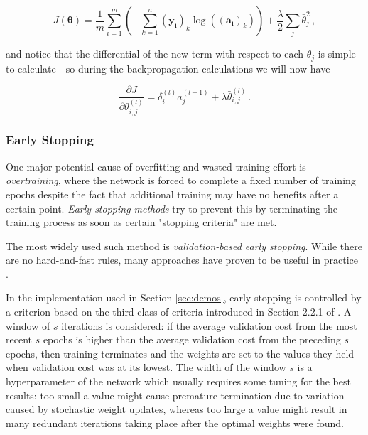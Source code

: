 \documentclass{article}[11pt]
\begin{document}
            $$
            J(\boldsymbol{\theta}) = \frac{1}{m} \sum_{i=1}^{m} \left( - \sum_{k=1}^{n} (\mathbf{y_i})_k \log(\mathbf{(a_i)}_k) \right) + \frac{\lambda}{2} \sum_j \bar{\theta}_j^2 \,,
            $$
            
            and notice that the differential of the new term with respect to each $\theta_j$ is simple to calculate - so during the backpropagation calculations we will now have
            
            $$
            \frac{\partial J}{\partial \theta^{(l)}_{i,j}} = \delta^{(l)}_i a^{(l-1)}_j + \lambda \bar{\theta}^{(l)}_{i,j} \,.
            $$
            
        
        
        \subsubsection{Early Stopping} \label{sec:early_stopping}
            
            One major potential cause of overfitting and wasted training effort is \textit{overtraining}, where the network is forced to complete a fixed number of training epochs despite the fact that additional training may have no benefits after a certain point. \textit{Early stopping methods} try to prevent this by terminating the training process as soon as certain "stopping criteria" are met.
            
            The most widely used such method is \textit{validation-based early stopping}. While there are no hard-and-fast rules, many approaches have proven to be useful in practice \cite{early_stopping}.
            
            In the implementation used in Section \ref{sec:demos}, early stopping is controlled by a criterion based on the third class of criteria introduced in Section 2.2.1 of \cite{early_stopping}. A window of $s$ iterations is considered: if the average validation cost from the most recent $s$ epochs is higher than the average validation cost from the preceding $s$ epochs, then training terminates and the weights are set to the values they held when validation cost was at its lowest. The width of the window $s$ is a hyperparameter of the network which usually requires some tuning for the best results: too small a value might cause premature termination due to variation caused by stochastic weight updates, whereas too large a value might result in many redundant iterations taking place after the optimal weights were found.
            
\end{document}
